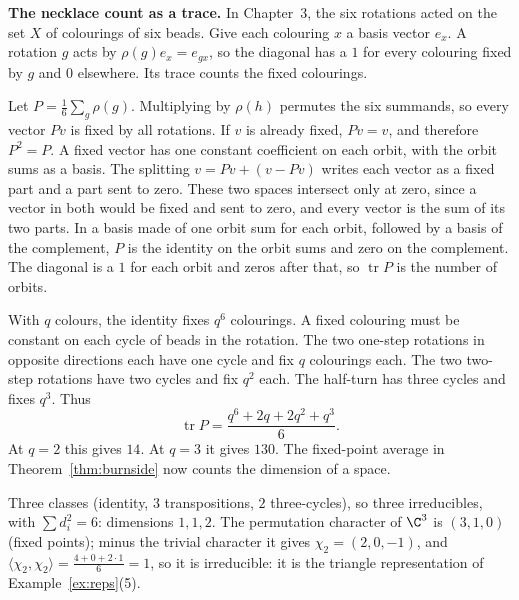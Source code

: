 \textbf{The necklace count as a trace.} In Chapter~3, the six rotations acted on the set $X$ of colourings of six beads. Give each colouring $x$ a basis vector $e_x$. A rotation $g$ acts by $\rho(g)e_x=e_{gx}$, so the diagonal has a $1$ for every colouring fixed by $g$ and $0$ elsewhere. Its trace counts the fixed colourings.

Let $P=\frac16\sum_g\rho(g)$. Multiplying by $\rho(h)$ permutes the six summands, so every vector $Pv$ is fixed by all rotations. If $v$ is already fixed, $Pv=v$, and therefore $P^2=P$. A fixed vector has one constant coefficient on each orbit, with the orbit sums as a basis. The splitting $v=Pv+(v-Pv)$ writes each vector as a fixed part and a part sent to zero. These two spaces intersect only at zero, since a vector in both would be fixed and sent to zero, and every vector is the sum of its two parts. In a basis made of one orbit sum for each orbit, followed by a basis of the complement, $P$ is the identity on the orbit sums and zero on the complement. The diagonal is a $1$ for each orbit and zeros after that, so $\operatorname{tr}P$ is the number of orbits.

With $q$ colours, the identity fixes $q^6$ colourings. A fixed colouring must be constant on each cycle of beads in the rotation. The two one-step rotations in opposite directions each have one cycle and fix $q$ colourings each. The two two-step rotations have two cycles and fix $q^2$ each. The half-turn has three cycles and fixes $q^3$. Thus
\[
\operatorname{tr}P=\frac{q^6+2q+2q^2+q^3}{6}.
\]
At $q=2$ this gives $14$. At $q=3$ it gives $130$. The fixed-point average in Theorem~\ref{thm:burnside} now counts the dimension of a space.

\begin{example}[$\mathfrak S_3$]\label{ex:s3}
Three classes (identity, $3$ transpositions, $2$ three-cycles), so three irreducibles, with $\sum d_i^2=6$: dimensions $1,1,2$. The permutation character of $\C^3$ is $(3,1,0)$ (fixed points); minus the trivial character it gives $\chi_2=(2,0,-1)$, and $\langle\chi_2,\chi_2\rangle=\frac{4+0+2\cdot1}6=1$, so it is irreducible: it is the triangle representation of Example~\ref{ex:reps}(5).
\end{example}

